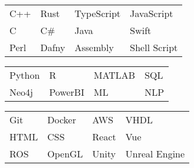 \documentclass[paper=a4,fontsize=10pt]{resume}
\begin{document}
{	
		\begin{tabular}{llll}
			C++ & Rust & TypeScript & JavaScript \\
			C & C\# & Java & Swift \\
			Perl & Dafny & Assembly & Shell Script
		\end{tabular}

		\medskip\normalsize

		\begin{tabular}{llll}
			Python & R & MATLAB & SQL \\
			Neo4j & PowerBI & ML & NLP
		\end{tabular}

		\medskip\normalsize

		\begin{tabular}{llll}
			Git & Docker & AWS & VHDL \\
			HTML & CSS & React & Vue \\
			ROS & OpenGL & Unity & Unreal Engine \\
		\end{tabular}
}
\end{document}
